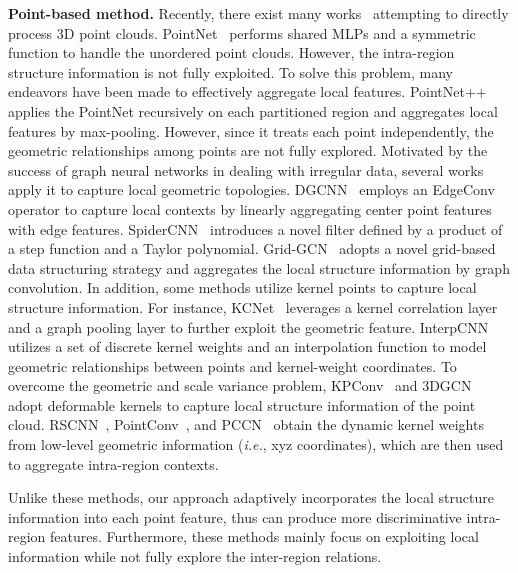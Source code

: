 \documentclass[journal]{IEEEtran}
\def\ie{\emph{i.e.}}
\begin{document}
\textbf{Point-based method.}
Recently, there exist many works~\cite{qi2017pointnet,qi2017pointnet++,han2020point2node,xu2020geometry,lin2020fpconv,xu2020grid} attempting to directly process 3D point clouds.  PointNet~\cite{qi2017pointnet} performs shared MLPs and a symmetric function to handle the unordered point clouds. 
However, the intra-region structure information is not fully exploited. To solve this problem, many endeavors have been made to effectively aggregate local features.
PointNet++~\cite{qi2017pointnet++} applies the PointNet recursively on each partitioned region and aggregates local features by max-pooling. However, since it treats each point independently, the geometric relationships among points are not fully explored. Motivated by the success of graph neural networks in dealing with irregular data, several works apply it to capture local geometric topologies. DGCNN~\cite{wang2019dynamic} employs an EdgeConv operator to capture local contexts by linearly aggregating center point features with edge features. SpiderCNN~\cite{xu2018spidercnn} introduces a novel filter defined by a product of a step function and a Taylor polynomial.
Grid-GCN~\cite{xu2020grid} adopts a novel grid-based data structuring strategy and aggregates the local structure information by graph convolution. 
In addition, some methods utilize kernel points to capture local structure information. For instance, KCNet~\cite{shen2018mining} leverages a kernel correlation layer and a graph pooling layer to further exploit the geometric feature. InterpCNN~\cite{mao2019interpolated} utilizes a set of discrete kernel weights
and an interpolation function to model geometric relationships between points and kernel-weight coordinates. To overcome the geometric and scale variance problem, KPConv~\cite{thomas2019kpconv} and 3DGCN~\cite{lin2020convolution} adopt deformable kernels to capture local structure information of the point cloud.
RSCNN~\cite{liu2019relation}, PointConv~\cite{wu2019pointconv},  and PCCN~\cite{wang2018deep} obtain the dynamic kernel weights from low-level geometric information (\ie, xyz coordinates), which are then used to aggregate intra-region contexts. 


Unlike these methods, our approach adaptively incorporates the local structure information into each point feature, thus can produce more discriminative intra-region features. Furthermore, these methods mainly focus on exploiting local information while not fully explore the inter-region relations. 
\end{document}
